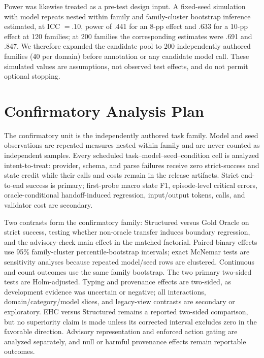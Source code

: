 Power was likewise treated as a pre-test design input.  A fixed-seed simulation
with model repeats nested within family and family-cluster bootstrap inference
estimated, at ICC $=.10$, power of .441 for an 8-pp effect and .633 for a 10-pp
effect at 120 families; at 200 families the corresponding estimates were .691
and .847.  We therefore expanded the candidate pool to 200 independently
authored families (40 per domain) before annotation or any candidate model call.
These simulated values are assumptions, not observed test effects, and do not
permit optional stopping.

\section{Confirmatory Analysis Plan}

The confirmatory unit is the independently authored task family.  Model and
seed observations are repeated measures nested within family and are never
counted as independent samples.  Every scheduled task--model--seed--condition
cell is analyzed intent-to-treat: provider, schema, and parse failures receive
zero strict-success and state credit while their calls and costs remain in the
release artifacts.  Strict end-to-end success is primary; first-probe macro
state F1, episode-level critical errors, oracle-conditional handoff-induced
regression, input/output tokens, calls, and validator cost are secondary.

Two contrasts form the confirmatory family: Structured versus Gold Oracle on
strict success, testing whether non-oracle transfer induces boundary regression,
and the advisory-check main effect in the matched factorial.  Paired binary
effects use 95\% family-cluster percentile-bootstrap intervals; exact McNemar
tests are sensitivity analyses because repeated model/seed rows are clustered.
Continuous and count outcomes use the same family bootstrap.  The two primary
two-sided tests are Holm-adjusted.  Typing and provenance effects are two-sided,
as development evidence was uncertain or negative; all interactions,
domain/category/model slices, and legacy-view contrasts are secondary or
exploratory.  EHC versus Structured remains a reported two-sided comparison,
but no superiority claim is made unless its corrected interval excludes zero
in the favorable direction.  Advisory representation and enforced action
gating are analyzed separately, and null or harmful provenance effects remain
reportable outcomes.
